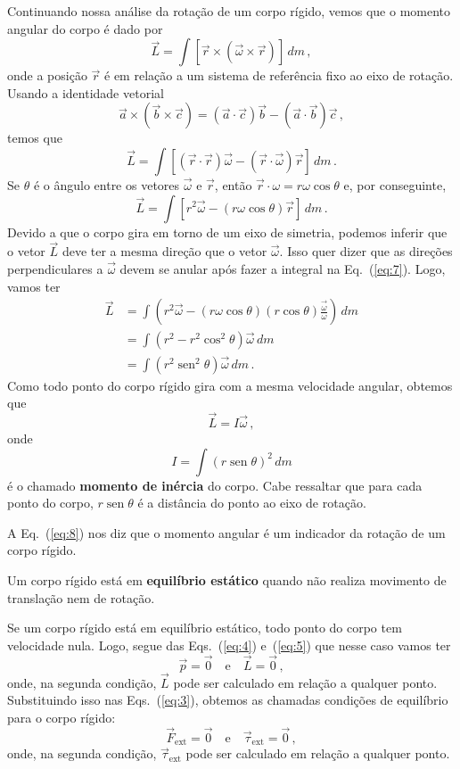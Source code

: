 \documentclass[papersize=a4,DIV=calc,twocolumn=on]{scrartcl}
\newcommand{\dpar}[1]{\left(#1\right)}
\theoremstyle{definition}
\DeclareMathOperator{\sen}{sen}
\begin{document}
Continuando nossa análise da rotação de um corpo rígido, vemos que o
momento angular do corpo é dado por
$$\vec L=\int [\vec r\times(\vec\omega\times\vec r)]\,dm\,,$$
onde a posição $\vec r$ é em relação a um sistema de referência fixo
ao eixo de rotação.  Usando a identidade vetorial
$$\vec a\times(\vec b\times\vec c)=(\vec a\cdot\vec c)\vec b-(\vec a\cdot\vec b)\vec c\,,$$
temos que
\begin{equation}
  \label{eq:7}
  \vec L=\int [(\vec r\cdot\vec r)\vec\omega-(\vec r\cdot\vec\omega)\vec r]\,dm\,.
\end{equation}
Se $\theta$ é o ângulo entre os vetores $\vec\omega$ e $\vec r$, então
$\vec r\cdot\omega=r\omega\cos\theta$ e, por conseguinte,
$$\vec L=\int [r^2\vec\omega-(r\omega\cos\theta)\vec r]\,dm\,.$$
Devido a que o corpo gira em torno de um eixo de simetria, podemos
inferir que o vetor $\vec L$ deve ter a mesma direção que o vetor
$\vec\omega$. Isso quer dizer que as direções perpendiculares a
$\vec\omega$ devem se anular após fazer a integral na
Eq.~(\ref{eq:7}). Logo, vamos ter
\begin{equation*}
  \begin{split}
    \vec L&=\int \dpar{r^2\vec\omega-(r\omega\cos\theta)(r\cos\theta)\frac{\vec\omega}{\omega}}\,dm\\
    &=\int (r^2-r^2\cos^2\theta)\vec\omega\,dm\\
    &=\int (r^2\sen^2\theta)\vec\omega\,dm\,.
  \end{split}
\end{equation*}
Como todo ponto do corpo rígido gira com a mesma velocidade angular,
obtemos que
\begin{equation}
  \label{eq:8}
  \vec L=I\vec\omega\,,
\end{equation}
onde
\begin{equation}
  \label{eq:9}
  I=\int (r\sen\theta)^2\,dm
\end{equation}
é o chamado \textbf{momento de inércia} do corpo. Cabe ressaltar que
para cada ponto do corpo, $r\sen\theta$ é a distância do ponto ao eixo
de rotação.

A Eq.~(\ref{eq:8}) nos diz que o momento angular é um indicador da
rotação de um corpo rígido.

Um corpo rígido está em \textbf{equilíbrio estático} quando não
realiza movimento de translação nem de rotação.

Se um corpo rígido está em equilíbrio estático, todo ponto do corpo
tem velocidade nula. Logo, segue das Eqs.~(\ref{eq:4}) e~(\ref{eq:5})
que nesse caso vamos ter
$$\vec p=\vec 0\quad\text{e}\quad\vec L=\vec 0\,,$$
onde, na segunda condição, $\vec L$ pode ser calculado em relação a
qualquer ponto. Substituindo isso nas Eqs.~(\ref{eq:3}), obtemos as
chamadas condições de equilíbrio para o corpo rígido:
\begin{equation}
  \label{eq:10}
  {\vec F}_{\mathrm{ext}}=\vec 0\quad\text{e}\quad \vec\tau_{\mathrm{ext}}=\vec 0\,,
\end{equation}
onde, na segunda condição, $\vec\tau_{\mathrm{ext}}$ pode ser
calculado em relação a qualquer ponto.
\end{document}
